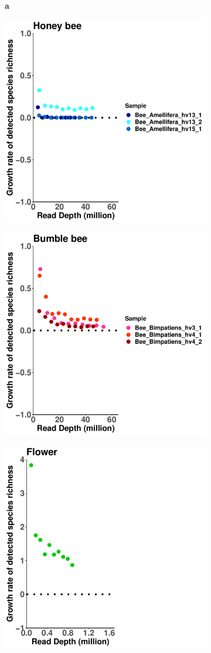 \documentclass[11pt]{article}
\begin{document}
      \begin{figure}[H]
        \begin{subfigure}
          \centering
          \textbf{a}
        \end{subfigure}
        \hspace{0.32\linewidth}
        \begin{subfigure}
          
          \textbf{b}
        \end{subfigure}
        \hspace{0.32\linewidth}
        \begin{subfigure}
          
          \textbf{c}
        \end{subfigure}
        \newline
        \hfill
        \begin{subfigure}
          \centering
          \includegraphics[width=0.3\linewidth,height=0.3\linewidth]{../Figures/ExtraSpecies_Honey.pdf}
        \end{subfigure}
        \hfill
        \begin{subfigure}
          \centering
          \includegraphics[width=0.3\linewidth,height=0.3\linewidth]{../Figures/ExtraSpecies_Bumble.pdf}
        \end{subfigure}
        \hfill
        \begin{subfigure}
          \centering
          \includegraphics[width=0.3\linewidth,height=0.3\linewidth]{../Figures/ExtraSpecies_Flower.pdf}

\end{subfigure}
\end{figure}
\end{document}

